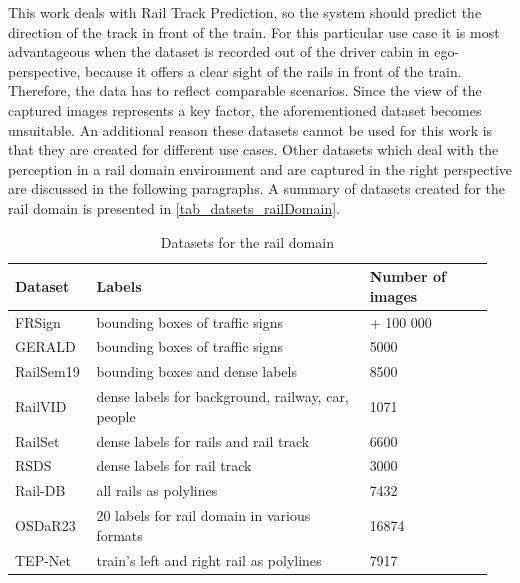 This work deals with Rail Track Prediction, so the system should predict the direction of the track in front of the train. For this particular use case it is most advantageous when the dataset is recorded out of the driver cabin in ego-perspective, because it offers a clear sight of the rails in front of the train. Therefore, the data has to reflect comparable scenarios. 
Since the view of the captured images represents a key factor, the aforementioned dataset becomes unsuitable.
An additional reason these datasets cannot be used for this work is that they are created for different use cases.
Other datasets which deal with the perception in a rail domain environment and are captured in the right perspective are discussed in the following paragraphs. A summary of datasets created for the rail domain is presented in \autoref{tab_datsets_railDomain}.

\begin{table}[H]
\centering
\caption{Datasets for the rail domain}\label{tab_datsets_railDomain}
\begin{tabular}{| p{0.15\linewidth} | p{0.55\linewidth} | p{0.25\linewidth} |}\hline
\textbf{Dataset} & \textbf{Labels} & \textbf{Number of images}\\\hline
FRSign              & bounding boxes of traffic signs & + 100 000 \\\hline
GERALD              & bounding boxes of traffic signs & 5000 \\\hline
RailSem19           & bounding boxes and dense labels & 8500 \\\hline
RailVID             & dense labels for background, railway, car, people & 1071 \\\hline
RailSet             & dense labels for rails and rail track & 6600 \\\hline
RSDS                & dense labels for rail track & 3000 \\\hline
Rail-DB             & all rails as polylines & 7432 \\\hline
OSDaR23             & 20 labels for rail domain in various formats & 16874 \\\hline
TEP-Net             & train's left and right rail as polylines & 7917 \\\hline
\end{tabular}
\end{table}

